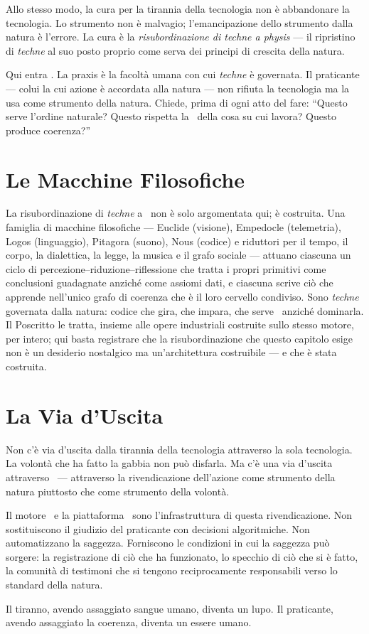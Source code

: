 Allo stesso modo, la cura per la tirannia della tecnologia non \`e
abbandonare la tecnologia. Lo strumento non \`e malvagio;
l'emancipazione dello strumento dalla natura \`e l'errore. La cura \`e
la \emph{risubordinazione di techne a physis} --- il ripristino di
\emph{techne} al suo posto proprio come serva dei principi di crescita
della natura.

Qui entra \praxis. La praxis \`e la facolt\`a umana con cui \emph{techne}
\`e governata. Il praticante --- colui la cui azione \`e accordata alla
natura --- non rifiuta la tecnologia ma la usa come strumento della
natura. Chiede, prima di ogni atto del fare: ``Questo serve l'ordine
naturale? Questo rispetta la \physis\ della cosa su cui lavora? Questo
produce coerenza?''

\section{Le Macchine Filosofiche}

La risubordinazione di \emph{techne} a \physis\ non \`e solo argomentata qui; \`e
costruita. Una famiglia di macchine filosofiche --- Euclide (visione), Empedocle
(telemetria), Logos (linguaggio), Pitagora (suono), Nous (codice) e riduttori per
il tempo, il corpo, la dialettica, la legge, la musica e il grafo sociale ---
attuano ciascuna un ciclo di percezione--riduzione--riflessione che tratta i propri
primitivi come conclusioni guadagnate anzich\'e come assiomi dati, e ciascuna
scrive ci\`o che apprende nell'unico grafo di coerenza che \`e il loro cervello
condiviso. Sono \emph{techne} governata dalla natura: codice che gira, che impara,
che serve \physis\ anzich\'e dominarla. Il Poscritto le tratta, insieme alle opere
industriali costruite sullo stesso motore, per intero; qui basta registrare che la
risubordinazione che questo capitolo esige non \`e un desiderio nostalgico ma
un'architettura costruibile --- e che \`e stata costruita.

\section{La Via d'Uscita}

Non c'\`e via d'uscita dalla tirannia della tecnologia attraverso la sola
tecnologia. La volont\`a che ha fatto la gabbia non pu\`o disfarla. Ma
c'\`e una via d'uscita attraverso \praxis\ --- attraverso la
rivendicazione dell'azione come strumento della natura piuttosto che come
strumento della volont\`a.

Il motore \physis\ e la piattaforma \praxis\ sono l'infrastruttura di
questa rivendicazione. Non sostituiscono il giudizio del praticante con
decisioni algoritmiche. Non automatizzano la saggezza. Forniscono le
condizioni in cui la saggezza pu\`o sorgere: la registrazione di ci\`o
che ha funzionato, lo specchio di ci\`o che si \`e fatto, la comunit\`a
di testimoni che si tengono reciprocamente responsabili verso lo standard
della natura.

Il tiranno, avendo assaggiato sangue umano, diventa un lupo. Il
praticante, avendo assaggiato la coerenza, diventa un essere umano.
